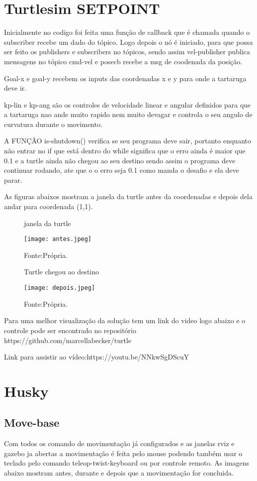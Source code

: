 \section{Turtlesim SETPOINT}
Inicialmente no codigo foi feita uma função de callback que é chamada quando o subscriber recebe um dado do tópico. 
Logo depois o nó é iniciado, para que possa ser feito os publishers e subscribers no tópicos, sendo assim 
vel-publisher publica mensagens no tópico cmd-vel e posecb recebe a msg de coodenada da posição.

Goal-x e goal-y recebem os inputs das coordenadas x e y para onde a tartaruga deve ir. 

kp-lin e kp-ang são os controles de velocidade linear e angular definidos para que a tartaruga nao ande muito rapido nem
muito devagar e controla o seu angulo de curvatura durante o movimento.

A FUNÇÃO is-shutdown() verifica se seu programa deve sair, portanto enquanto não entrar no if que está dentro do while significa que o erro ainda é 
maior que 0.1 e a turtle ainda não chegou ao seu destino sendo assim o programa deve continuar rodando, ate que o o erro seja 0.1 como manda o desafio
e ela deve parar.

As figuras abaixos mostram a janela da turtle antes da coordenadas e depois dela andar para coordenada (1,1).

\begin{figure} [h!]	
    \centering
    \caption{janela da turtle}
    \texttt{[image: antes.jpeg]}
    \caption*{Fonte:Própria.}
    \label{fig:inicio}
\end{figure}

\begin{figure} [h!]	
    \centering
    \caption{Turtle chegou ao destino}
    \texttt{[image: depois.jpeg]}
    \caption*{Fonte:Própria.}
    \label{fig:fim}
\end{figure}
Para uma melhor visualização da solução tem um link do video 
logo abaixo e o controle pode ser encontrado no repositório https://github.com/marcellabecker/turtle  

Link para assistir ao vídeo:https://youtu.be/NNkwSgDScuY
\section{Husky}
\subsection{Move-base}
Com todos os comando de movimentação já configurados e as janelas rviz e gazebo ja abertas a movimentação é feita pelo mouse podendo também usar o teclado pelo comando teleop-twist-keyboard ou por controle remoto.
As imagens abaixo mostram antes, durante e depois que a movimentação for concluida. 

